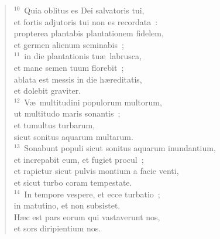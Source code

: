 \begin{flushleft}
\begin{verse}
${}^{10}$~Quia oblitus es Dei salvatoris tui,\\ et fortis adjutoris tui non es recordata~:\\ propterea plantabis plantationem fidelem,\\ et germen alienum seminabis~;\\
${}^{11}$~in die plantationis tu\ae\ labrusca,\\ et mane semen tuum florebit~;\\ ablata est messis in die h\ae reditatis,\\ et dolebit graviter.\\
${}^{12}$~V\ae\ multitudini populorum multorum,\\ ut multitudo maris sonantis~;\\ et tumultus turbarum,\\ sicut sonitus aquarum multarum.\\
${}^{13}$~Sonabunt populi sicut sonitus aquarum inundantium,\\ et increpabit eum, et fugiet procul~;\\ et rapietur sicut pulvis montium a facie venti,\\ et sicut turbo coram tempestate.\\
${}^{14}$~In tempore vespere, et ecce turbatio~;\\ in matutino, et non subsistet.\\ H\ae c est pars eorum qui vastaverunt nos,\\ et sors diripientium nos.\end{verse}\end{flushleft}


